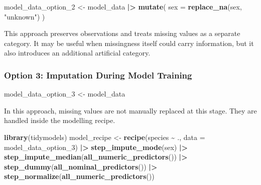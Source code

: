 \documentclass[
]{article}
\newenvironment{Shaded}{\begin{snugshade}}{\end{snugshade}}
\newcommand{\AttributeTok}[1]{\textcolor[rgb]{0.13,0.29,0.53}{#1}}
\newcommand{\FunctionTok}[1]{\textcolor[rgb]{0.13,0.29,0.53}{\textbf{#1}}}
\newcommand{\NormalTok}[1]{#1}
\newcommand{\OtherTok}[1]{\textcolor[rgb]{0.56,0.35,0.01}{#1}}
\newcommand{\SpecialCharTok}[1]{\textcolor[rgb]{0.81,0.36,0.00}{\textbf{#1}}}
\newcommand{\StringTok}[1]{\textcolor[rgb]{0.31,0.60,0.02}{#1}}
\begin{document}
\begin{Shaded}
\begin{Highlighting}[]
\NormalTok{model\_data\_option\_2 }\OtherTok{\textless{}{-}}\NormalTok{ model\_data }\SpecialCharTok{|\textgreater{}}
  \FunctionTok{mutate}\NormalTok{(}
    \AttributeTok{sex =} \FunctionTok{replace\_na}\NormalTok{(sex, }\StringTok{"unknown"}\NormalTok{)}
\NormalTok{  )}
\end{Highlighting}
\end{Shaded}

This approach preserves observations and treats missing values as a
separate category. It may be useful when missingness itself could carry
information, but it also introduces an additional artificial category.

\subsubsection{Option 3: Imputation During Model
Training}\label{option-3-imputation-during-model-training}

\begin{Shaded}
\begin{Highlighting}[]
\NormalTok{model\_data\_option\_3 }\OtherTok{\textless{}{-}}\NormalTok{ model\_data}
\end{Highlighting}
\end{Shaded}

In this approach, missing values are not manually replaced at this
stage. They are handled inside the modelling recipe.

\begin{Shaded}
\begin{Highlighting}[]
\FunctionTok{library}\NormalTok{(tidymodels)}
\NormalTok{model\_recipe }\OtherTok{\textless{}{-}} \FunctionTok{recipe}\NormalTok{(species }\SpecialCharTok{\textasciitilde{}}\NormalTok{ ., }\AttributeTok{data =}\NormalTok{ model\_data\_option\_3) }\SpecialCharTok{|\textgreater{}}
  \FunctionTok{step\_impute\_mode}\NormalTok{(sex) }\SpecialCharTok{|\textgreater{}}
  \FunctionTok{step\_impute\_median}\NormalTok{(}\FunctionTok{all\_numeric\_predictors}\NormalTok{()) }\SpecialCharTok{|\textgreater{}}
  \FunctionTok{step\_dummy}\NormalTok{(}\FunctionTok{all\_nominal\_predictors}\NormalTok{()) }\SpecialCharTok{|\textgreater{}}
  \FunctionTok{step\_normalize}\NormalTok{(}\FunctionTok{all\_numeric\_predictors}\NormalTok{())}
\end{Highlighting}
\end{Shaded}
\end{document}
